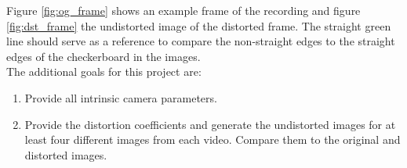Figure \ref{fig:og_frame} shows an example frame of the recording and figure \ref{fig:dst_frame} the undistorted image of the distorted frame. The straight green line should serve as a reference to compare the non-straight edges to the straight edges of the checkerboard in the images.\\

The additional goals for this project are:
\begin{enumerate}[leftmargin=0.9cm]
    \item Provide all intrinsic camera parameters.
    \item Provide the distortion coefficients and generate the undistorted images for at least four different images from each video. Compare them to the original and distorted images.
\end{enumerate}

\newpage
